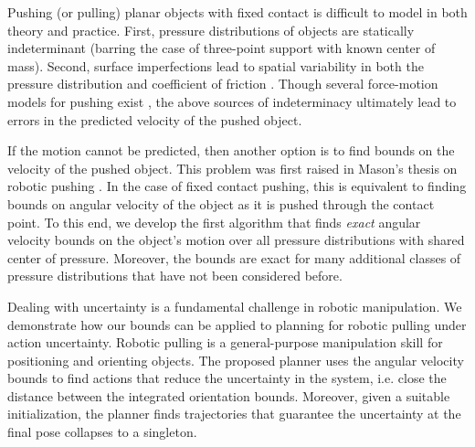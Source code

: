 \documentclass[conference]{IEEEtran}
\begin{document}



Pushing (or pulling) planar objects with fixed contact is difficult to
model in both theory and practice. First, pressure distributions of
objects are statically indeterminant (barring the case of three-point
support with known center of mass). Second, surface imperfections lead
to spatial variability in both the pressure distribution and
coefficient of friction \cite{YuBFR16}. Though several force-motion
models for pushing exist
\cite{zhou2016convex,howe1996practical,goyal1991planar}, the above
sources of indeterminacy ultimately lead to errors in the predicted
velocity of the pushed object.

If the motion cannot be predicted, then another option is to find
bounds on the velocity of the pushed object. This problem was first
raised in Mason's thesis on robotic pushing \cite{Mason1982}. In the
case of fixed contact pushing, this is equivalent to finding bounds on
angular velocity of the object as it is pushed through the contact
point. To this end, we develop the first algorithm that finds
\textit{exact} angular velocity bounds on the object's motion over all
pressure distributions with shared center of pressure. Moreover, the
bounds are exact for many additional classes of pressure distributions
that have not been considered before.

Dealing with uncertainty is a fundamental challenge in robotic
manipulation. We demonstrate how our bounds can be applied to planning
for robotic pulling under action uncertainty. Robotic pulling is a
general-purpose manipulation skill for positioning and orienting
objects. The proposed planner uses the angular velocity bounds to find
actions that reduce the uncertainty in the system, i.e. close the
distance between the integrated orientation bounds. Moreover, given a
suitable initialization, the planner finds trajectories that guarantee
the uncertainty at the final pose collapses to a singleton.
\end{document}
